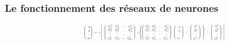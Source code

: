 \documentclass[10pt]{beamer}
\begin{document}
\begin{frame}
\frametitle{Le fonctionnement des réseaux de neurones}
  

\begin{equation*}
\resizebox{0.5\textwidth}{!}{ %
$\begin{pmatrix}
  y_{1} \\[0.3em]
  y_{2} \\
  \vdots \\
  y_{m}
\end{pmatrix}
  =
  \sigma\left[
  \begin{pmatrix}
  h^{(2)}_{1,1} & h^{(2)}_{1,2} & \ldots & h^{(2)}_{1,k} \\
  h^{(2)}_{2,1} & h^{(2)}_{2,2} & \ldots & h^{(2)}_{2,k} \\
  \vdots & \vdots & \ddots & \vdots \\
  h^{(2)}_{m,1} & h^{(2)}_{m,2} & \ldots & h^{(2)}_{m,k}
  \end{pmatrix}
  \sigma\left(
\begin{pmatrix}
  h^{(1)}_{1,1} & h^{(1)}_{1,2} & \ldots & h^{(1)}_{1,n} \\
  h^{(1)}_{2,1} & h^{(1)}_{2,2} & \ldots & h^{(1)}_{2,n} \\
  \vdots & \vdots & \ddots & \vdots \\
  h^{(1)}_{k,1} & h^{(1)}_{k,2} & \ldots & h^{(1)}_{k,n}
  \end{pmatrix}
  \begin{pmatrix}
  x_{1} \\[0.3em]
  x_{2} \\
  \vdots \\
  x_{n}
  \end{pmatrix}
  +
  \begin{pmatrix}
  b_{1}^{(1)} \\[0.3em]
  b_{2}^{(1)} \\
  \vdots \\
  b_{k}^{(1)}
  \end{pmatrix}
  \right)
  +
  \begin{pmatrix}
  b_{1}^{(2)} \\[0.3em]
  b_{2}^{(2)} \\
  \vdots \\
  b_{m}^{(2)}
  \end{pmatrix}
  \right] 
$}
\end{equation*}


\end{frame}
\end{document}

